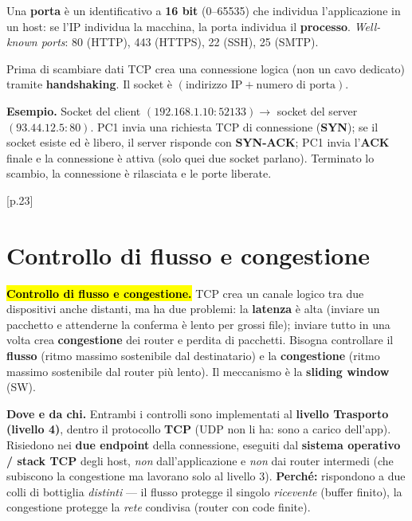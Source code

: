 \documentclass[11pt,a4paper]{report}
\begin{document}
Una \textbf{porta} è un identificativo a \textbf{16 bit} (0--65535) che individua l'applicazione in un host: se l'IP individua la macchina, la porta individua il \textbf{processo}. \emph{Well-known ports}: 80 (HTTP), 443 (HTTPS), 22 (SSH), 25 (SMTP).

Prima di scambiare dati TCP crea una connessione logica (non un cavo dedicato) tramite \textbf{handshaking}. Il socket è $(\text{indirizzo IP} + \text{numero di porta})$.


\textbf{Esempio.} Socket del client $(192.168.1.10{:}52133)\to$ socket del server $(93.44.12.5{:}80)$. PC1 invia una richiesta TCP di connessione (\textbf{SYN}); se il socket esiste ed è libero, il server risponde con \textbf{SYN-ACK}; PC1 invia l'\textbf{ACK} finale e la connessione è attiva (solo quei due socket parlano). Terminato lo scambio, la connessione è rilasciata e le porte liberate.

\noindent\hfill{\footnotesize\color{gray}[p.23]}\\
\section{Controllo di flusso e congestione}
\hl{\textbf{Controllo di flusso e congestione.}} TCP crea un canale logico tra due dispositivi anche distanti, ma ha due problemi: la \textbf{latenza} è alta (inviare un pacchetto e attenderne la conferma è lento per grossi file); inviare tutto in una volta crea \textbf{congestione} dei router e perdita di pacchetti. Bisogna controllare il \textbf{flusso} (ritmo massimo sostenibile dal destinatario) e la \textbf{congestione} (ritmo massimo sostenibile dal router più lento). Il meccanismo è la \textbf{sliding window} (SW).

\textbf{Dove e da chi.} Entrambi i controlli sono implementati al \textbf{livello Trasporto (livello 4)}, dentro il protocollo \textbf{TCP} (UDP non li ha: sono a carico dell'app). Risiedono nei \textbf{due endpoint} della connessione, eseguiti dal \textbf{sistema operativo / stack TCP} degli host, \emph{non} dall'applicazione e \emph{non} dai router intermedi (che subiscono la congestione ma lavorano solo al livello 3). \textbf{Perché:} rispondono a due colli di bottiglia \emph{distinti} --- il flusso protegge il singolo \emph{ricevente} (buffer finito), la congestione protegge la \emph{rete} condivisa (router con code finite).
\end{document}

